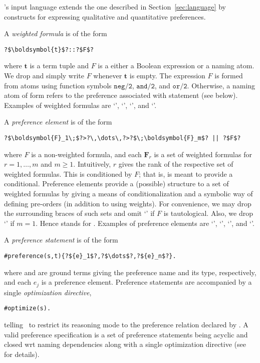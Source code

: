 \asprin's input language extends the one described in Section~\ref{sec:language} by constructs for expressing qualitative and quantitative preferences.

A \emph{weighted formula} is of the form
\begin{lstlisting}[numbers=none,escapechar=?]
?$\boldsymbol{t}$?::?$F$?
\end{lstlisting}
where $\boldsymbol{t}$ is a term tuple and $F$ is a either a Boolean expression or a naming atom.
We drop \code{::} and simply write $F$ whenever $\boldsymbol{t}$ is empty.
The expression
$F$ is formed from atoms using function symbols $\mathtt{neg/2}$, $\mathtt{and/2}$, and $\mathtt{or/2}$.
%
Otherwise, a naming atom of form 
refers to the preference associated with statement  (see below).
%
Examples of weighted formulas are 
`', 
`', 
`', and 
`'. 

A \emph{preference element} is of the form
\begin{lstlisting}[numbers=none,escapechar=?]
?$\boldsymbol{F}_1\;$?>?\,\dots\,?>?$\;\boldsymbol{F}_m$? || ?$F$?
\end{lstlisting}
where $F$ is a non-weighted formula, and each $\boldsymbol{F}_r$
is a set of weighted formulas for $r=1,\dots,m$ and $m\geq 1$.
%
Intuitively, $r$ gives the rank of the respective set of weighted formulas.
This is conditioned by $F$; that is, \code{||} is meant to provide a conditional.
Preference elements provide a (possible) structure to a set of weighted formulas
by giving a means of conditionalization and a symbolic way of defining pre-orders (in addition to using weights).
%
For convenience, we may drop the surrounding braces of such sets
and omit `' if $F$ is tautological.
Also, we drop `\code{>}' if $m=1$.
%
Hence
 stands for 
. 
%
Examples of preference elements are 
`',  
`', 
`',  and
`'.

A \emph{preference statement} is of the form
%
\begin{lstlisting}[numbers=none,escapechar=?]
#preference(s,t){?${e}_1$?,?$\dots$?,?${e}_n$?}.
\end{lstlisting}
%
where  and  are ground terms giving the preference name and its type,
respectively, and each $e_j$ is a preference element.
%
Preference statements are accompanied by a single
\emph{optimization directive},
\begin{lstlisting}[numbers=none,escapechar=?]
#optimize(s).
\end{lstlisting}
telling \asprin\ to restrict its reasoning mode to the preference relation declared by .
% 
A valid {preference specification} is a set of preference statements
being acyclic and closed wrt naming dependencies
along with a single optimization directive
(see \cite{brderosc15a} for details).

